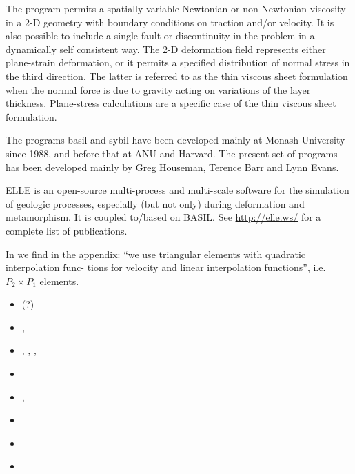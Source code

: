 The program permits a spatially variable Newtonian  or  non-Newtonian  viscosity  in a 2-D 
geometry with boundary conditions on traction and/or velocity.  It is also  possible  
to include  a single fault or discontinuity in the problem in a dynamically self consistent way.  
The 2-D deformation  field represents  either plane-strain deformation, or it permits 
a specified distribution of normal stress in the third  direction.   The  latter is referred 
to as the thin viscous sheet formulation when the normal force is due to  gravity  acting on 
variations of the layer thickness.  Plane-stress calculations are a specific case of 
the thin viscous sheet formulation.

The programs basil and sybil have been developed  mainly  at Monash  University  since  1988,  
and before that at ANU and Harvard.  The present set of  programs  has  been  developed mainly  by  
Greg  Houseman, Terence  Barr  and  Lynn Evans.

ELLE is an open-source multi-process and multi-scale software for the simulation of geologic processes, 
especially (but not only) during deformation and metamorphism. It is coupled to/based on BASIL. 
See \url{http://elle.ws/} for a complete list of publications.

In \textcite{baho96} we find in the appendix: ``we use triangular elements with quadratic interpolation func-
tions for velocity and linear interpolation functions'', i.e. $P_2 \times P_1$ elements.

\begin{small}
\begin{itemize}
\item[\nineteenninetytwo]    \textcite{baho92}(?)
\item[\nineteenninetysix]    \textcite{baho96},  \textcite{hoen96}
\item[\nineteenninetyseven]  \textcite{hogu97},  \textcite{homo97},
                             \textcite{bobt97},  \textcite{neho97}
\item[\twothousand]          \textcite{honk00}
\item[\twothousandone]       \textcite{tesb01},  \textcite{jebe01}
\item[\twothousandeight]     \textcite{bokj08}
\item[\twothousandweventeen] \textcite{waeh17}
\item[\twothousandnineteen]  \textcite{llor19}
\end{itemize}
\end{small}


